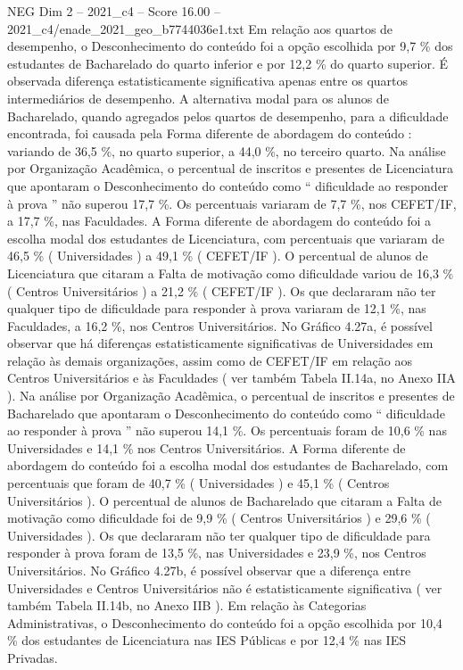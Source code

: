 \begin{textsample}{NEG Dim 2 – 2021\_c4 – Score 16.00 – 2021\_c4/enade\_2021\_geo\_b7744036e1.txt}
Em relação aos quartos de desempenho, o Desconhecimento do conteúdo foi a opção escolhida por 9,7 \% dos estudantes de Bacharelado do quarto inferior e por 12,2 \% do quarto superior.
É observada diferença estatisticamente significativa apenas entre os quartos intermediários de desempenho.
A alternativa modal para os alunos de Bacharelado, quando agregados pelos quartos de desempenho, para a dificuldade encontrada, foi causada pela Forma diferente de abordagem do conteúdo : variando de 36,5 \%, no quarto superior, a 44,0 \%, no terceiro quarto.
Na análise por Organização Acadêmica, o percentual de inscritos e presentes de Licenciatura que apontaram o Desconhecimento do conteúdo como “ dificuldade ao responder à prova ” não superou 17,7 \%.
Os percentuais variaram de 7,7 \%, nos CEFET/IF, a 17,7 \%, nas Faculdades.
A Forma diferente de abordagem do conteúdo foi a escolha modal dos estudantes de Licenciatura, com percentuais que variaram de 46,5 \% ( Universidades ) a 49,1 \% ( CEFET/IF ).
O percentual de alunos de Licenciatura que citaram a Falta de motivação como dificuldade variou de 16,3 \% ( Centros Universitários ) a 21,2 \% ( CEFET/IF ).
Os que declararam não ter qualquer tipo de dificuldade para responder à prova variaram de 12,1 \%, nas Faculdades, a 16,2 \%, nos Centros Universitários.
No Gráfico 4.27a, é possível observar que há diferenças estatisticamente significativas de Universidades em relação às demais organizações, assim como de CEFET/IF em relação aos Centros Universitários e às Faculdades ( ver também Tabela II.14a, no Anexo IIA ).
Na análise por Organização Acadêmica, o percentual de inscritos e presentes de Bacharelado que apontaram o Desconhecimento do conteúdo como “ dificuldade ao responder à prova ” não superou 14,1 \%.
Os percentuais foram de 10,6 \% nas Universidades e 14,1 \% nos Centros Universitários.
A Forma diferente de abordagem do conteúdo foi a escolha modal dos estudantes de Bacharelado, com percentuais que foram de 40,7 \% ( Universidades ) e 45,1 \% ( Centros Universitários ).
O percentual de alunos de Bacharelado que citaram a Falta de motivação como dificuldade foi de 9,9 \% ( Centros Universitários ) e 29,6 \% ( Universidades ).
Os que declararam não ter qualquer tipo de dificuldade para responder à prova foram de 13,5 \%, nas Universidades e 23,9 \%, nos Centros Universitários.
No Gráfico 4.27b, é possível observar que a diferença entre Universidades e Centros Universitários não é estatisticamente significativa ( ver também Tabela II.14b, no Anexo IIB ).
Em relação às Categorias Administrativas, o Desconhecimento do conteúdo foi a opção escolhida por 10,4 \% dos estudantes de Licenciatura nas IES Públicas e por 12,4 \% nas IES Privadas.

\end{textsample}
